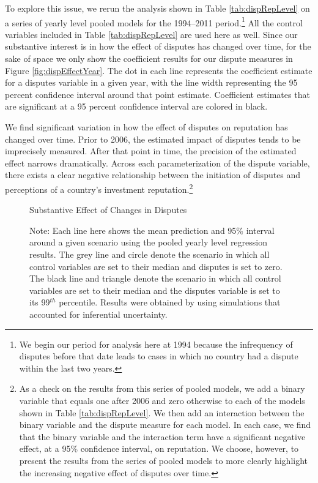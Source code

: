 \documentclass[12pt,onesided]{amsart}
\begin{document}
To explore this issue, we rerun the analysis shown in Table \ref{tab:dispRepLevel} on a series of yearly level pooled models for the 1994--2011 period.\footnote{We begin our period for analysis here at 1994 because the infrequency of disputes before that date leads to cases in which no country had a dispute within the last two years.} All the control variables included in Table \ref{tab:dispRepLevel} are used here as well. Since our substantive interest is in how the effect of disputes has changed over time, for the sake of space we only show the coefficient results for our dispute measures in Figure \ref{fig:dispEffectYear}. The dot in each line represents the coefficient estimate for a disputes variable in a given year, with the line width representing the 95 percent confidence interval around that point estimate. Coefficient estimates that are significant at a 95 percent confidence interval are colored in black. 

We find significant variation in how the effect of disputes on reputation has changed over time. Prior to 2006, the estimated impact of disputes tends to be imprecisely measured. After that point in time, the precision of the estimated effect narrows dramatically. Across each parameterization of the dispute variable, there exists a clear negative relationship between the initiation of disputes and perceptions of a country's investment reputation.\footnote{As a check on the results from this series of pooled models, we add a binary variable that equals one after 2006 and zero otherwise to each of the models shown in Table \ref{tab:dispRepLevel}. We then add an interaction between the binary variable and the dispute measure for each model. In each case, we find that the binary variable and the interaction term have a significant negative effect, at a 95\% confidence interval, on reputation. We choose, however, to present the results from the series of pooled models to more clearly highlight the increasing negative effect of disputes over time.} 

\begin{figure}[ht]
	\centering
	\caption{Substantive Effect of Changes in Disputes}
	\label{fig:dispEffectYearSim}
	\resizebox{1\textwidth}{!}{}
	\caption*{Note: Each line here shows the mean prediction and 95\% interval around a given scenario using the pooled yearly level regression results. The grey line and circle denote the scenario in which all control variables are set to their median and disputes is set to zero. The black line and triangle denote the scenario in which all control variables are set to their median and the disputes variable is set to its 99$^{th}$ percentile. Results were obtained by using simulations that accounted for inferential uncertainty. }
\end{figure}
\FloatBarrier
\end{document}
